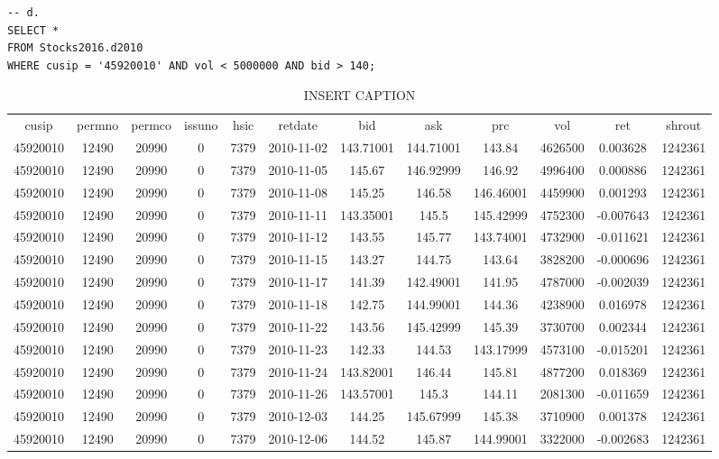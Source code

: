 \documentclass[12 pt]{article}
\begin{document}
\begin{flushleft}
\begin{verbatim}
-- d.
SELECT *
FROM Stocks2016.d2010
WHERE cusip = '45920010' AND vol < 5000000 AND bid > 140; 
 \end{verbatim} 
\begin{table}[h] 
\centering 
\caption{INSERT CAPTION} 
\label{my - label} 
\begin{tabular}{c c c c c c c c c c c c } 
\\
cusip & permno & permco & issuno & hsic & retdate & bid & ask & prc & vol & ret & shrout\\
45920010 & 12490 & 20990 & 0 & 7379 & 2010-11-02 & 143.71001 & 144.71001 & 143.84 & 4626500 & 0.003628 & 1242361\\
45920010 & 12490 & 20990 & 0 & 7379 & 2010-11-05 & 145.67 & 146.92999 & 146.92 & 4996400 & 0.000886 & 1242361\\
45920010 & 12490 & 20990 & 0 & 7379 & 2010-11-08 & 145.25 & 146.58 & 146.46001 & 4459900 & 0.001293 & 1242361\\
45920010 & 12490 & 20990 & 0 & 7379 & 2010-11-11 & 143.35001 & 145.5 & 145.42999 & 4752300 & -0.007643 & 1242361\\
45920010 & 12490 & 20990 & 0 & 7379 & 2010-11-12 & 143.55 & 145.77 & 143.74001 & 4732900 & -0.011621 & 1242361\\
45920010 & 12490 & 20990 & 0 & 7379 & 2010-11-15 & 143.27 & 144.75 & 143.64 & 3828200 & -0.000696 & 1242361\\
45920010 & 12490 & 20990 & 0 & 7379 & 2010-11-17 & 141.39 & 142.49001 & 141.95 & 4787000 & -0.002039 & 1242361\\
45920010 & 12490 & 20990 & 0 & 7379 & 2010-11-18 & 142.75 & 144.99001 & 144.36 & 4238900 & 0.016978 & 1242361\\
45920010 & 12490 & 20990 & 0 & 7379 & 2010-11-22 & 143.56 & 145.42999 & 145.39 & 3730700 & 0.002344 & 1242361\\
45920010 & 12490 & 20990 & 0 & 7379 & 2010-11-23 & 142.33 & 144.53 & 143.17999 & 4573100 & -0.015201 & 1242361\\
45920010 & 12490 & 20990 & 0 & 7379 & 2010-11-24 & 143.82001 & 146.44 & 145.81 & 4877200 & 0.018369 & 1242361\\
45920010 & 12490 & 20990 & 0 & 7379 & 2010-11-26 & 143.57001 & 145.3 & 144.11 & 2081300 & -0.011659 & 1242361\\
45920010 & 12490 & 20990 & 0 & 7379 & 2010-12-03 & 144.25 & 145.67999 & 145.38 & 3710900 & 0.001378 & 1242361\\
45920010 & 12490 & 20990 & 0 & 7379 & 2010-12-06 & 144.52 & 145.87 & 144.99001 & 3322000 & -0.002683 & 1242361\\

\end{tabular}
\end{table}
\end{flushleft}
\end{document}
